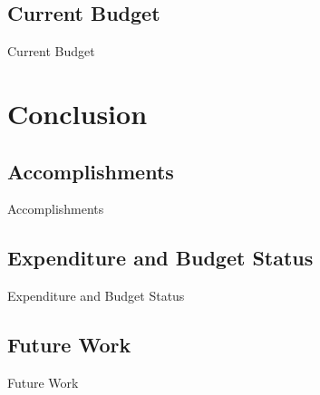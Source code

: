 \documentclass[14pt, aspectratio=169]{beamer}
\begin{document}
\subsection{Current Budget}
\begin{frame}{Current Budget}

\end{frame}
\section{Conclusion}
\subsection{Accomplishments}
\begin{frame}{Accomplishments}

\end{frame}
\subsection{Expenditure and Budget Status}
\begin{frame}{Expenditure and Budget Status}

\end{frame}
\subsection{Future Work}
\begin{frame}{Future Work}

\end{frame}
\end{document}
